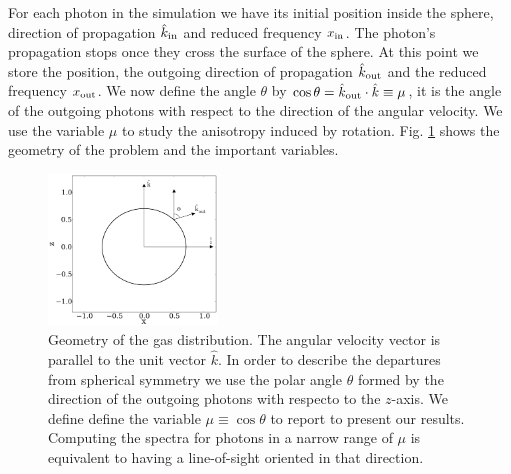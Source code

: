 \documentclass{emulateapj}
\begin{document}
For each photon in the simulation we have its initial position inside
the sphere, direction of propagation $\hat{k}_{\rm in}$ and reduced
frequency $x_{\rm in}$. 
The photon's propagation stops once they cross the
surface of the sphere. At this point we store the position, the outgoing direction
of propagation $\hat{k}_{\rm out}$ and the reduced frequency $x_{\rm
  out}$. We now define the angle $\theta$ by $\cos\theta = \hat{k}_{\rm out}\cdot
\hat{k}\equiv \mu$, it is the angle of the outgoing photons with 
respect to the direction of the angular velocity. We use the variable $\mu$ to
study the anisotropy induced by rotation. Fig. \ref{fig:geometry}
shows the geometry of the problem and the important variables.




\begin{figure}
\begin{center}
  \includegraphics[width=0.4\textwidth]{f1.pdf}
\end{center}
\caption{Geometry of the gas distribution. The angular velocity vector
  is parallel to the unit vector $\hat{k}$. In order to describe the
  departures from spherical symmetry we use the polar angle $\theta$
  formed by the direction of the outgoing photons with respecto to the
  $z$-axis. We define define the variable $\mu\equiv\cos\theta$ to
  report to present our results. Computing the spectra for photons in
  a   narrow range of $\mu$ is equivalent to having a line-of-sight
  oriented in that direction.  
    \label{fig:geometry}}  
\end{figure}
\end{document}
